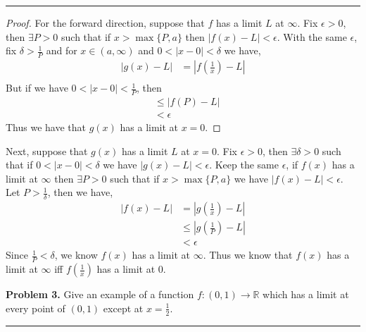 \documentclass[leqno]{article}
\theoremstyle{nonumberplain}
\newtheorem{proof}{Proof}
\begin{document}
\noindent\rule[0.5ex]{\linewidth}{1pt}

\begin{proof}
For the forward direction, suppose that $f$ has a limit $L$ at $\infty$.  Fix $\epsilon > 0$, then $\exists P >0$ such that if $x > \max\{P,a\}$ then $\left| f(x)-L\right| < \epsilon$.  With the same $\epsilon$, fix $\delta > \frac{1}{P}$ and for $x\in (a,\infty)$ and $0<|x-0|< \delta$ we have,
\begin{align*}
|g(x)-L|&= \left| f\left(\textstyle{\frac{1}{x}}\right) - L\right|\\
\end{align*}
But if we have $0<|x-0|<\frac{1}{P}$, then
\begin{align*}
&\leq \left| f(P)-L \right|\\
&< \epsilon
\end{align*}
Thus we have that $g(x)$ has a limit at $x=0$.
\end{proof}

Next, suppose that $g(x)$ has a limit $L$ at $x=0$.  Fix $\epsilon >0$, then $\exists \delta >0$ such that if $0<|x-0|<\delta$ we have $|g(x)-L|<\epsilon$.  Keep the same $\epsilon$, if $f(x)$ has a limit at $\infty$ then $\exists P>0$ such that if $x > \max\{P,a\}$ we have $|f(x)-L|<\epsilon$. Let $P>\frac{1}{\delta}$, then we have,
\begin{align*}
|f(x)-L| &= \left| g\left(\textstyle{\frac{1}{x}} \right) -L\right|\\
&\leq \left| g\left(\frac{1}{P}\right)-L\right|\\
&< \epsilon
\end{align*}
Since $\frac{1}{P}<\delta$, we know $f(x)$ has a limit at $\infty$.  
\noindent Thus we know that $f(x)$ has a limit at $\infty$ iff $f\left(\textstyle{\frac{1}{x}}\right)$ has a limit at $0$.
\pagebreak




\noindent\textbf{Problem 3.} Give an example of a function $f \colon (0,1) \to \mathbb{R}$ which has a limit at every point of $(0,1)$ except at $x=\frac{1}{2}$.


\noindent\rule[0.5ex]{\linewidth}{1pt}
\end{document}
